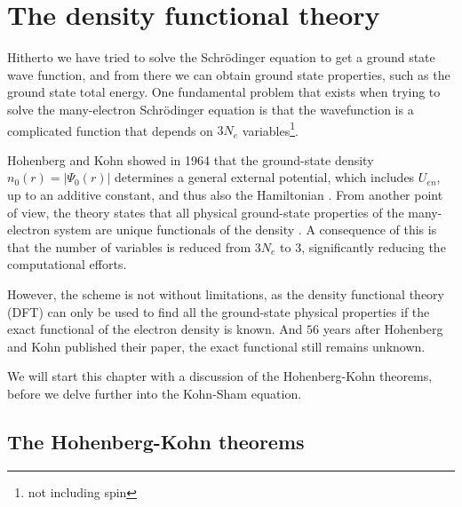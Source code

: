 
\section{The density functional theory}

Hitherto we have tried to solve the Schrödinger equation to get a ground state wave function, and from there we can obtain ground state properties, such as the ground state total energy. One fundamental problem that exists when trying to solve the many-electron Schrödinger equation is that the wavefunction is a complicated function that depends on $3N_e$ variables\footnote{not including spin}.

Hohenberg and Kohn \cite{Hohenberg1964} showed in 1964 that the ground-state density $n_0(r) = \lvert \Psi_0 (r)\rvert$ determines a general external potential, which includes $U_{en}$, up to an additive constant, and thus also the Hamiltonian \cite{Toulouse2019}. From another point of view, the theory states that all physical ground-state properties of the many-electron system are unique functionals of the density \cite{Persson2020}. A consequence of this is that the number of variables is reduced from $3N_e$ to $3$, significantly reducing the computational efforts.

However, the scheme is not without limitations, as the density functional theory (DFT) can only be used to find all the ground-state physical properties if the exact functional of the electron density is known. And $56$ years after Hohenberg and Kohn published their paper, the exact functional still remains unknown.

We will start this chapter with a discussion of the Hohenberg-Kohn theorems, before we delve further into the Kohn-Sham equation.

\subsection{The Hohenberg-Kohn theorems}

